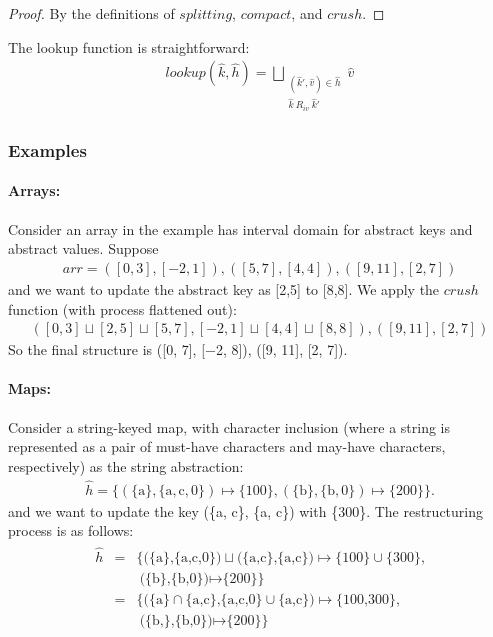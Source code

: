 \documentclass[preprint,9pt]{sigplanconf} %
\begin{document}
\begin{proof}
By the definitions of $splitting$, $compact$, and $crush$.
\end{proof}

The lookup function is straightforward:
\begin{align*}
lookup(\hat k, \hat h) = \bigsqcup_{\substack{(\hat k',\hat v)\in \hat
h \\ \hat k\ R_{iv}\ \hat k'}} \hat v
\end{align*}

\subsubsection{Examples}
\paragraph{Arrays:}
Consider an array in the example has interval domain for abstract keys
and abstract values. Suppose
\begin{align*}
arr = ([0,3], [-2,1]), ([5,7], [4,4]), ([9,11], [2,7])
\end{align*}
and we want to update the abstract key as [2,5] to
[8,8]. We apply the $crush$ function (with process flattened
out):
\begin{align*}
{([0, 3]\sqcup[2, 5]\sqcup[5, 7], [−2, 1]\sqcup[4, 4]\sqcup[8, 8]), ([9, 11], [2, 7])}
\end{align*}
So the final structure is {([0, 7], [−2,
    8]), ([9, 11], [2, 7])}.

\paragraph{Maps:}
Consider a string-keyed map, with character inclusion (where a string
is represented as a pair of must-have characters and may-have
characters, respectively) as the string abstraction:
\begin{align*}
\hat h = \{(\{\text{a}\}, \{\text{a}, \text{c}, 0\}) \mapsto \{100\}, (\{\text{b}\}, \{\text{b}, 0\}) \mapsto \{200\}\}.
\end{align*}
and we want to update the key (\{a, c\}, \{a, c\}) with \{300\}. The restructuring process is as follows:
\begin{align*}
\begin{array}{rcl}
\hat h & = & \text{\{(\{a\},\{a,c,0\})} \sqcup
\text{(\{a,c\},\{a,c\})} \mapsto \text{\{100\}} \cup
\text{\{300\},}\\
&&\ \text{(\{b\},\{b,0\})} \mapsto \text{\{200\}\}} \\
&=& \text{\{(\{a\}} \cap \text{\{a,c\},\{a,c,0\}} \cup \text{\{a,c\})}
\mapsto \text{\{100,300\},} \\
&&\ \text{(\{b,\},\{b,0\})} \mapsto \text{\{200\}\}}
\end{array}
\end{align*}
\end{document}

